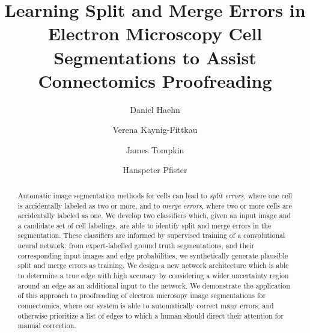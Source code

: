 \documentclass{llncs}
\begin{document}
%
\title{Learning Split and Merge Errors in Electron Microscopy Cell Segmentations to Assist Connectomics Proofreading}
%
%
\author{Daniel Haehn \and Verena Kaynig-Fittkau
\and James Tompkin \and Hanspeter Pfister}
%
%
%

\maketitle              %

\begin{abstract}
Automatic image segmentation methods for cells can lead to \emph{split errors}, where one cell is accidentally labeled as two or more, and to \emph{merge errors}, where two or more cells are accidentally labeled as one. We develop two classifiers which, given an input image and a candidate set of cell labelings, are able to identify split and merge errors in the segmentation. These classifiers are informed by supervised training of a convolutional neural network: from expert-labelled ground truth segmentations, and their corresponding input images and edge probabilities, we synthetically generate plausible split and merge errors as training. We design a new network architecture which is able to determine a true edge with high accuracy by considering a  wider uncertainty region around an edge as an additional input to the network. We demonstrate the application of this approach to proofreading of electron microsopy image segmentations for connectomics, where our system is able to automatically correct many errors, and otherwise prioritize a list of edges to which a human should direct their attention for manual correction.
\end{abstract}
%









%
%


\end{document}
